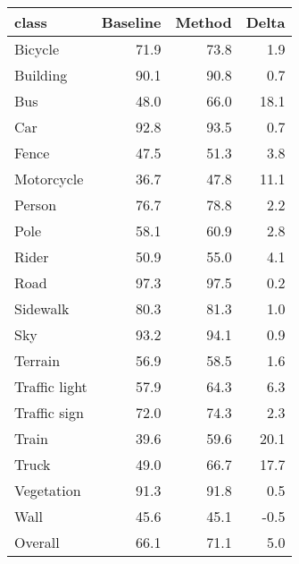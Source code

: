\begin{tabular}{lrrr}
\toprule
class & Baseline & Method & Delta \\
\midrule
Bicycle & 71.9 & 73.8 & 1.9 \\
Building & 90.1 & 90.8 & 0.7 \\
Bus & 48.0 & 66.0 & 18.1 \\
Car & 92.8 & 93.5 & 0.7 \\
Fence & 47.5 & 51.3 & 3.8 \\
Motorcycle & 36.7 & 47.8 & 11.1 \\
Person & 76.7 & 78.8 & 2.2 \\
Pole & 58.1 & 60.9 & 2.8 \\
Rider & 50.9 & 55.0 & 4.1 \\
Road & 97.3 & 97.5 & 0.2 \\
Sidewalk & 80.3 & 81.3 & 1.0 \\
Sky & 93.2 & 94.1 & 0.9 \\
Terrain & 56.9 & 58.5 & 1.6 \\
Traffic light & 57.9 & 64.3 & 6.3 \\
Traffic sign & 72.0 & 74.3 & 2.3 \\
Train & 39.6 & 59.6 & 20.1 \\
Truck & 49.0 & 66.7 & 17.7 \\
Vegetation & 91.3 & 91.8 & 0.5 \\
Wall & 45.6 & 45.1 & -0.5 \\
Overall & 66.1 & 71.1 & 5.0 \\
\bottomrule
\end{tabular}
